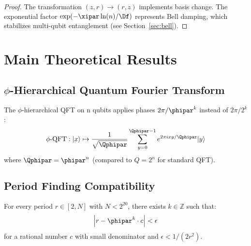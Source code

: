 \begin{proof}
	The transformation $(z, r) \to (r, z)$ implements basis change. The exponential factor $\exp(-\xipar \ln(n)/\Df)$ represents Bell damping, which stabilizes multi-qubit entanglement (see Section~\ref{sec:bell}).
\end{proof}

\section{Main Theoretical Results}
\label{sec:maintheorem}

\subsection{$\phi$-Hierarchical Quantum Fourier Transform}

\begin{definition}
	The $\phi$-hierarchical QFT on n qubits applies phases $2\pi/\phipar^k$ instead of $2\pi/2^k$:
	\begin{equation}
		\text{$\phi$-QFT}: |x\rangle \mapsto \frac{1}{\sqrt{\Qphipar}} \sum_{y=0}^{\Qphipar-1} e^{2\pi i xy / \Qphipar} |y\rangle
	\end{equation}
	where $\Qphipar = \phipar^n$ (compared to $Q = 2^n$ for standard QFT).
\end{definition}

\subsection{Period Finding Compatibility}

\begin{lemma}
	\label{lem:phi_coverage}
	For every period $r \in [2, N]$ with $N < 2^{20}$, there exists $k \in \mathbb{Z}$ such that:
	\begin{equation}
		\left| r - \phipar^k \cdot c \right| < \epsilon
	\end{equation}
	for a rational number $c$ with small denominator and $\epsilon < 1/(2r^2)$.
\end{lemma}

